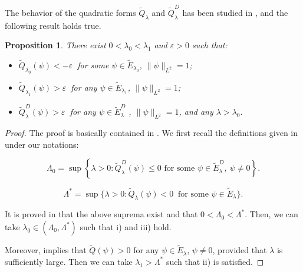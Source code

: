 \documentclass[reqno]{amsart}
\newtheorem{proposition}[theorem]{Proposition}
\def\e{\varepsilon}
\numberwithin{equation}{section}
\newenvironment{key words}{\textbf{Keywords}\mbox{  }}{ }
\begin{document}
\medskip

The behavior of the quadratic forms $\tilde{Q}_{\lambda}$ and $\tilde{Q}^D_{\lambda}$ has been studied in \cite{RRS20}, and the following result holds true.

\begin{proposition} \label{Pr26} There exist $0 < \lambda_0 < \lambda_1$ and $\e > 0$ such that:
	\begin{itemize}
		\item [(i)] $\tilde{Q}_{\lambda_{0}}(\psi)< - \e \ $ for some $\psi\in \tilde{E}_{\lambda_0}$, $\| \psi \|_{L^2} =1$;
		\item [(ii)] $\tilde{Q}_{\lambda_1}(\psi)> \e \ $  for any $\psi\in \tilde{E}_{\lambda_1}$, $\| \psi \|_{L^2} =1$;
		\item [(iii)] $\tilde{Q}^D_{\lambda}(\psi)> \e \ $ for any $\psi\in \tilde{E}^D_{\lambda}$ , $\| \psi \|_{L^2} =1$, and any $\lambda > \lambda_{0}.$
	\end{itemize}
\end{proposition}

\begin{proof} The proof is basically contained in \cite{RRS20}. We first recall the definitions given in \cite[(3.6) and (5.7)]{RRS20} under our notations:
	
\begin{equation} \label{Lambda0}  \Lambda_0 = \sup \left\{ \lambda >0: \tilde{Q}_\lambda^D(\psi) \leq 0 \mbox{ for some } \psi \in \tilde{E}_\lambda^D, \ \psi \neq 0 \right\}. \end{equation}

\begin{equation} \label{Lambda*} \Lambda^* = \sup \{ \lambda >0: \tilde{Q}_\lambda(\psi) < 0 \ \mbox{ for some } \psi \in \tilde{E}_{\lambda}\}. \end{equation}

It is proved in \cite{RRS20} that the above suprema exist and that $0 < \Lambda_0 < \Lambda^*$. Then, we can take $\lambda_0 \in  (\Lambda_0, \Lambda^*)$ such that i) and iii) hold.

\medskip

Moreover, \cite[Proposition 5.3]{RRS20} implies that $\tilde{Q}(\psi)>0$ for any $\psi \in \tilde{E}_\lambda$, $\psi \neq 0$, provided that $\lambda$ is sufficiently large. Then we can take $\lambda_1 > \Lambda^*$ such that ii) is satisfied.
	

\end{proof}
\end{document}
